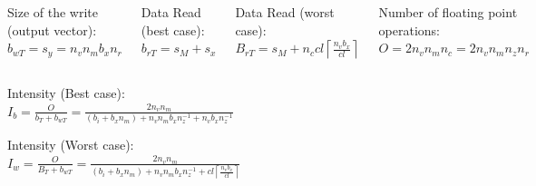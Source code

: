 \documentclass{beamer}
\newcommand{\ceil}[1]{\left\lceil#1\right\rceil}
\begin{document}
\begin{frame}
\begin{columns}
    Size of the write (output vector):\\$b_{wT} = s_y = n_v n_m b_x n_r$

    Data Read (best case):\\$b_{rT} = s_M + s_x$
    
    Data Read (worst case):\\$B_{rT} = s_M + n_c cl \ceil{\frac{n_vb_x}{cl}}$

    Number of floating point operations:\\$O = 2 n_v n_m n_c = 2 n_v n_m n_z n_r$
  \end{columns}

  \begin{center}
    Intensity (Best case):\\
    $I_b = \frac{O}{b_T+ b_{wT}} = \frac{2 n_v n_m}{ (b_i + b_x n_m) + n_v n_m b_x n_z^{-1} + n_v b_x n_z^{-1} }$
    
    Intensity (Worst case):\\
    $I_w = \frac{O}{B_T+ b_{wT}} = \frac{2 n_v n_m}{(b_i+b_x n_m) + n_v n_m b_x n_z^{-1} + cl \ceil{\frac{n_vb_x}{cl}} }$
  \end{center}
\end{frame}
\end{document}
